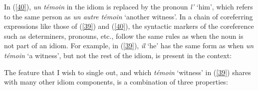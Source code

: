\documentclass[output=paper]{langsci/langscibook}
\begin{document}
\begin{exe}
\end{exe} 

\noindent In (\ref{40}), \textit{un témoin} in the idiom is replaced by the pronoun \textit{l’} ‘him’, which refers to the same person as \textit{un autre témoin} ‘another witness’. In a chain of coreferring expressions like those of (\ref{39}) and (\ref{40}), the syntactic markers of the coreference such as determiners, pronouns, etc., follow the same rules as when the noun is not part of an idiom. For example, in (\ref{39}), \textit{il} ‘he’ has the same form as when \textit{un témoin} ‘a witness’, but not the rest of the idiom, is present in the context:

\begin{exe}
\end{exe}
 
 
\noindent The feature that I wish to single out, and which \textit{témoin} ‘witness’ in (\ref{39}) shares with many other idiom components, is a combination of three properties:
\end{document}
